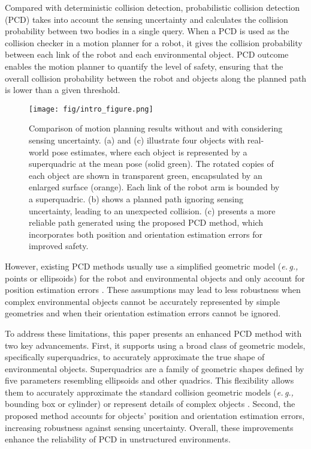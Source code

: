 \documentclass[conference]{IEEEtran}
\newcommand{\eg}[1]{\textit{e.\,g.,}{#1}}
\begin{document}
Compared with deterministic collision detection, probabilistic collision detection (PCD) takes into account the sensing uncertainty and calculates the collision probability between two bodies in a single query. When a PCD is used as the collision checker in a motion planner for a robot, it gives the collision probability between each link of the robot and each environmental object. PCD outcome enables the motion planner to quantify the level of safety, ensuring that the overall collision probability between the robot and objects along the planned path is lower than a given threshold. 

\begin{figure}[tb]
\centering
\texttt{[image: fig/intro\_figure.png]}
\caption{Comparison of motion planning results without and with considering sensing uncertainty. (a) and (c) illustrate four objects with real-world pose estimates, where each object is represented by a superquadric at the mean pose (solid green). The rotated copies of each object are shown in transparent green, encapsulated by an enlarged surface (orange). Each link of the robot arm is bounded by a superquadric. (b) shows a planned path ignoring sensing uncertainty, leading to an unexpected collision. (c) presents a more reliable path generated using the proposed PCD method, which incorporates both position and orientation estimation errors for improved safety.}
\label{fig:with/without-pcd}
\end{figure}

However, existing PCD methods usually use a simplified geometric model (\eg{ points or ellipsoids}) for the robot and environmental objects and only account for position estimation errors \cite{zhu2019chance, liu2023tight, thomas2022safe, park2020efficient}. These assumptions may lead to less robustness when complex environmental objects cannot be accurately represented by simple geometries and when their orientation estimation errors cannot be ignored. 

To address these limitations, this paper presents an enhanced PCD method with two key advancements. First, it supports using a broad class of geometric models, specifically superquadrics, to accurately approximate the true shape of environmental objects. Superquadrics are a family of geometric shapes defined by five parameters resembling ellipsoids and other quadrics. This flexibility allows them to accurately approximate the standard collision geometric models (\eg{ bounding box or cylinder}) or represent details of complex objects \cite{liu2023marching}. Second, the proposed method accounts for objects' position and orientation estimation errors, increasing robustness against sensing uncertainty. Overall, these improvements enhance the reliability of PCD in unstructured environments.
\end{document}
